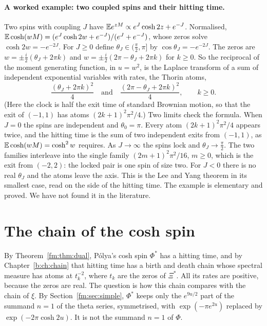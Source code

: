 \paragraph{A worked example: two coupled spins and their hitting time.} Two spins with coupling $J$ have $\mathbb{E} e^{zM}\propto e^{J}\cosh2z+e^{-J}$. Normalised, $\mathbb{E}\cosh(wM)=(e^{J}\cosh2w+e^{-J})/(e^{J}+e^{-J})$, whose zeros solve $\cosh2w=-e^{-2J}$. For $J\ge0$ define $\theta_J\in(\frac\pi2,\pi]$ by $\cos\theta_J=-e^{-2J}$. The zeros are $w=\pm\frac i2(\theta_J+2\pi k)$ and $w=\pm\frac i2(2\pi-\theta_J+2\pi k)$ for $k\ge0$. So the reciprocal of the moment generating function, in $u=w^2$, is the Laplace transform of a sum of independent exponential variables with rates, the Thorin atoms,
\[
\frac{(\theta_J+2\pi k)^2}{4}\quad\text{and}\quad\frac{(2\pi-\theta_J+2\pi k)^2}{4},\qquad k\ge0 .
\]
(Here the clock is half the exit time of standard Brownian motion, so that the exit of $(-1,1)$ has atoms $(2k+1)^2\pi^2/4$.) Two limits check the formula. When $J=0$ the spins are independent and $\theta_0=\pi$. Every atom $(2k+1)^2\pi^2/4$ appears twice, and the hitting time is the sum of two independent exits from $(-1,1)$, as $\mathbb{E}\cosh(wM)=\cosh^2w$ requires. As $J\to\infty$ the spins lock and $\theta_J\to\frac\pi2$. The two families interleave into the single family $(2m+1)^2\pi^2/16$, $m\ge0$, which is the exit from $(-2,2)$: the locked pair is one spin of size two. For $J<0$ there is no real $\theta_J$ and the atoms leave the axis. This is the Lee and Yang theorem in its smallest case, read on the side of the hitting time. The example is elementary and proved. We have not found it in the literature.

\section{The chain of the cosh spin}\label{f:sec:spinchain}

By Theorem~\ref{fm:thm:dual}, P\'olya's cosh spin $\Phi^*$ has a hitting time, and by Chapter~\ref{b:ch:chain} that hitting time has a birth and death chain whose spectral measure has atoms at $t_k^{-2}$, where $t_k$ are the zeros of $\Xi^*$. All its rates are positive, because the zeros are real. The question is how this chain compares with the chain of $\xi$. By Section~\ref{fm:sec:simple}, $\Phi^*$ keeps only the $e^{9u/2}$ part of the summand $n=1$ of the theta series, symmetrised, with $\exp(-\pi e^{2u})$ replaced by $\exp(-2\pi\cosh2u)$. It is not the summand $n=1$ of $\Phi$.

